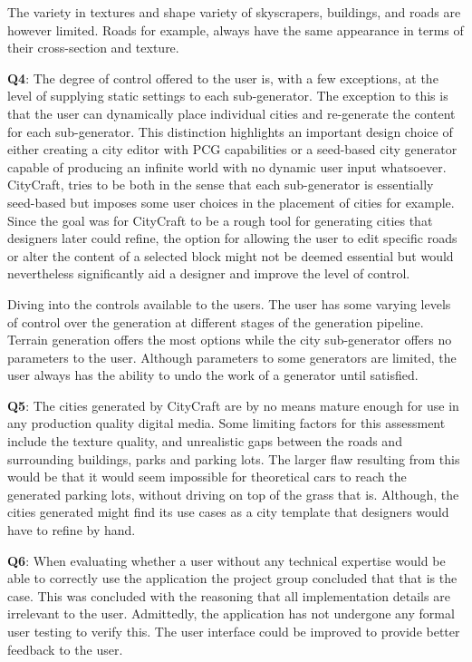 The variety in textures and shape variety of skyscrapers, buildings, and roads are however limited.
Roads for example, always have the same appearance in terms of their cross-section and texture.

\textbf{Q4}:
The degree of control offered to the user is, with a few exceptions, at the level of supplying static settings to each sub-generator.
The exception to this is that the user can dynamically place individual cities and re-generate the content for each sub-generator.
This distinction highlights an important design choice of either creating a city editor with PCG capabilities or a seed-based city generator capable of producing an infinite world with no dynamic user input whatsoever.
CityCraft, tries to be both in the sense that each sub-generator is essentially seed-based but imposes some user choices in the placement of cities for example.
Since the goal was for CityCraft to be a rough tool for generating cities that designers later could refine, the option for allowing the user to edit specific roads or alter the content of a selected block might not be deemed essential but would nevertheless significantly aid a designer and improve the level of control.

Diving into the controls available to the users.
The user has some varying levels of control over the generation at different stages of the generation pipeline.
Terrain generation offers the most options while the city sub-generator offers no parameters to the user. 
Although parameters to some generators are limited, the user always has the ability to undo the work of a generator until satisfied.

\textbf{Q5}:
The cities generated by CityCraft are by no means mature enough for use in any production quality digital media.
Some limiting factors for this assessment include the texture quality, and unrealistic gaps between the roads and surrounding buildings, parks and parking lots.
The larger flaw resulting from this would be that it would seem impossible for theoretical cars to reach the generated parking lots, without driving on top of the grass that is.
Although, the cities generated might find its use cases as a city template that designers would have to refine by hand.

\textbf{Q6}:
When evaluating whether a user without any technical expertise would be able to correctly use the application the project group concluded that that is the case.
This was concluded with the reasoning that all implementation details are irrelevant to the user.
Admittedly, the application has not undergone any formal user testing to verify this.
The user interface could be improved to provide better feedback to the user.


